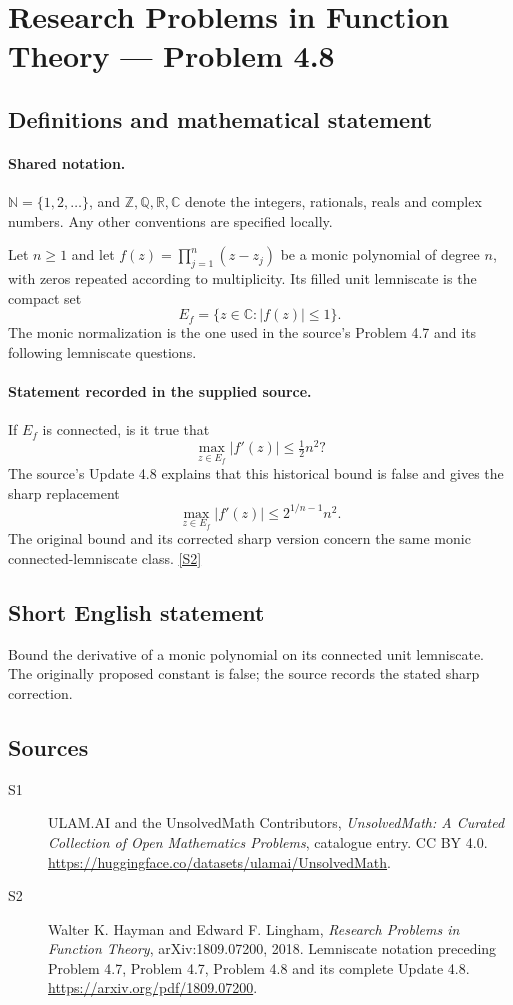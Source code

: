 \documentclass[11pt]{book}
\newcommand{\sref}[2]{\hyperlink{source:#1:#2}{[S#2]}}
\begin{document}
\section{Research Problems in Function Theory — Problem 4.8}\label{statement}

\subsection{Definitions and mathematical statement}

\paragraph{Shared notation.}$\mathbb N=\{1,2,\ldots\}$, and $\mathbb Z,\mathbb Q,\mathbb R,\mathbb C$ denote the integers, rationals, reals and complex numbers. Any other conventions are specified locally.


Let $n\ge1$ and let $f(z)=\prod_{j=1}^n(z-z_j)$ be a monic polynomial of degree $n$, with zeros repeated according to multiplicity. Its filled unit lemniscate is the compact set
\[E_f=\{z\in\mathbb C:|f(z)|\le1\}.
\]
The monic normalization is the one used in the source's Problem 4.7 and its following lemniscate questions.
\paragraph{Statement recorded in the supplied source.}
If $E_f$ is connected, is it true that
\[\max_{z\in E_f}|f'(z)|\le\tfrac12n^2?\]
The source's Update 4.8 explains that this historical bound is false and gives the sharp replacement
\[\max_{z\in E_f}|f'(z)|\le 2^{1/n-1}n^2.
\]
The original bound and its corrected sharp version concern the same monic connected-lemniscate class. \sref{statement}{2}
\subsection{Short English statement}
Bound the derivative of a monic polynomial on its connected unit lemniscate. The originally proposed constant is false; the source records the stated sharp correction.
\subsection{Sources}
\begin{description}
\item[\hypertarget{source:statement:1}{S1}] ULAM.AI and the UnsolvedMath Contributors, \emph{UnsolvedMath: A Curated Collection of Open Mathematics Problems}, catalogue entry. CC BY 4.0. \url{https://huggingface.co/datasets/ulamai/UnsolvedMath}.
\item[\hypertarget{source:statement:2}{S2}] Walter K. Hayman and Edward F. Lingham, \emph{Research Problems in Function Theory}, arXiv:1809.07200, 2018. Lemniscate notation preceding Problem 4.7, Problem 4.7, Problem 4.8 and its complete Update 4.8. \url{https://arxiv.org/pdf/1809.07200}.
\end{description}
\label{end:statement}
\end{document}
